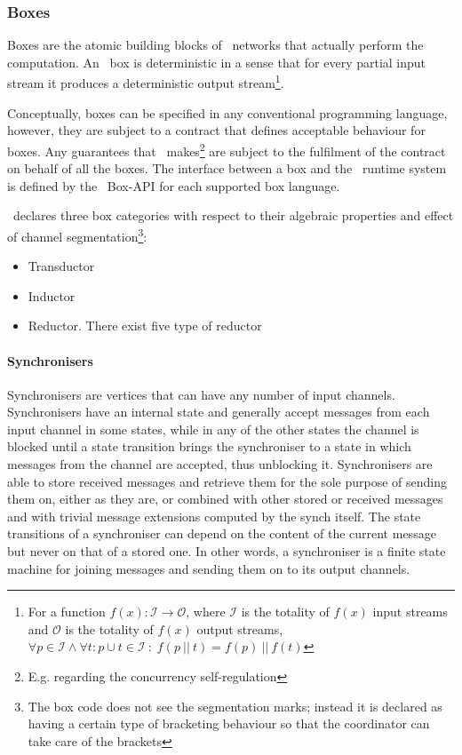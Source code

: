     \subsubsection{Boxes}
Boxes are the atomic building blocks of \ak\ networks that actually perform the computation. An \ak\ box is deterministic in a sense that for every partial input stream it produces a deterministic output stream\footnote{For a function $f(x): \mathcal{I} \to \mathcal{O}$, where $\mathcal{I}$ is the totality of $f(x)$ input streams and $\mathcal{O}$ is the totality of $f(x)$ output streams, $\forall p \in \mathcal{I} \land \forall t:p \cup t \in \mathcal{I} \: : \; f(p \:||\: t) = f(p) \:||\: f(t)$}.

Conceptually, boxes can be specified in any conventional programming language, however, they are subject to a contract that defines acceptable behaviour for boxes. Any guarantees that \ak\ makes\footnote{E.g. regarding the concurrency self-regulation} are subject to the fulfilment of the contract on behalf of all the boxes. The interface between a box and the \ak\ runtime system is defined by the \ak\ Box-API for each supported box language.

\ak\ declares three box categories with respect to their algebraic properties and effect of channel segmentation\footnote{The box code does not see the segmentation marks; instead it is declared as having a certain type of bracketing behaviour so that the coordinator can take care of the brackets}:
\begin{itemize}
\item Transductor

\item Inductor

\item Reductor. There exist five type of reductor
\end{itemize}



\paragraph{Synchronisers}
Synchronisers are vertices that can have any number of input channels. Synchronisers have an internal state and generally accept messages from each input channel in some states, while in any of the other states the channel is blocked until a state transition brings the synchroniser to a state in which messages from the channel are accepted, thus unblocking it. Synchronisers are able to store received messages and retrieve them for the sole purpose of sending them on, either as they are, or combined with other stored or received messages and with trivial message extensions computed by the synch itself. The state transitions of a synchroniser can depend on the content of the current message but never on that of a stored one. In other words, a synchroniser is a finite state machine for joining messages and sending them on to its output channels.

